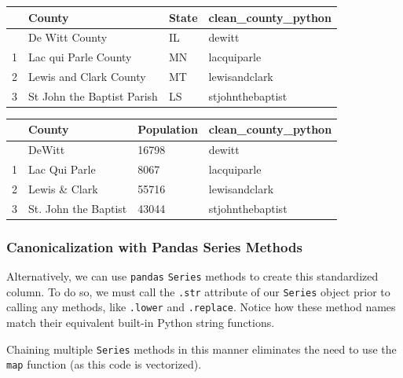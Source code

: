 \documentclass[
  letterpaper,
  DIV=11,
  numbers=noendperiod]{scrreprt}
\begin{document}
\begin{longtable}[]{@{}llll@{}}
\toprule\noalign{}
& County & State & clean\_county\_python \\
\midrule\noalign{}
\endhead
\bottomrule\noalign{}
\endlastfoot
0 & De Witt County & IL & dewitt \\
1 & Lac qui Parle County & MN & lacquiparle \\
2 & Lewis and Clark County & MT & lewisandclark \\
3 & St John the Baptist Parish & LS & stjohnthebaptist \\
\end{longtable}

\begin{longtable}[]{@{}llll@{}}
\toprule\noalign{}
& County & Population & clean\_county\_python \\
\midrule\noalign{}
\endhead
\bottomrule\noalign{}
\endlastfoot
0 & DeWitt & 16798 & dewitt \\
1 & Lac Qui Parle & 8067 & lacquiparle \\
2 & Lewis \& Clark & 55716 & lewisandclark \\
3 & St. John the Baptist & 43044 & stjohnthebaptist \\
\end{longtable}

\subsubsection{Canonicalization with Pandas Series
Methods}\label{canonicalization-with-pandas-series-methods}

Alternatively, we can use \texttt{pandas} \texttt{Series} methods to
create this standardized column. To do so, we must call the
\texttt{.str} attribute of our \texttt{Series} object prior to calling
any methods, like \texttt{.lower} and \texttt{.replace}. Notice how
these method names match their equivalent built-in Python string
functions.

Chaining multiple \texttt{Series} methods in this manner eliminates the
need to use the \texttt{map} function (as this code is vectorized).
\end{document}
